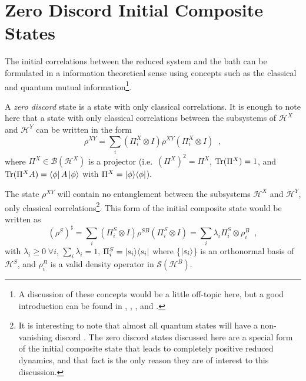 \section{Zero Discord Initial Composite States}
The initial correlations between the reduced system and the bath can be formulated in a information theoretical sense using concepts such as the classical and quantum mutual information\footnote{A discussion of these concepts would be a little off-topic here, but a good introduction can be found in \cite{Zurek2003}, \cite{Zurek2002}, \cite{Ollivier2001}, \cite{Rodriguez2010} and \cite{Rodriguez2008A}.}.  
\begin{definition}
A {\em zero discord} state is a state with only classical correlations.  It is enough to note here that a state with only classical correlations between the subsystems of $\mathcal{H}^X$ and $\mathcal{H}^Y$ can be written in the form \cite{Rodriguez2008}
\begin{equation*}
\rho^{XY} = \sum_i \left(\Pi^X_i\otimes I\right) \rho^{XY} \left(\Pi^X_i\otimes I\right)\;\;,
\end{equation*}
where $\Pi^X\in\mathcal{B}(\mathcal{H}^X)$ is a projector (i.e.\ $\left(\Pi^X\right)^2 = \Pi^X$, $\operatorname{Tr}(\Pi^X) = 1$, and $\operatorname{Tr}(\Pi^X A) = \left\langle\phi\right|A\left|\phi\right\rangle$ with $\Pi^X=|\phi\rangle\langle\phi|$).  
\end{definition}
The state $\rho^{XY}$ will contain no entanglement between the subsystems $\mathcal{H}^X$ and $\mathcal{H}^Y$, only classical correlations\footnote{It is interesting to note that almost all quantum states will have a non-vanishing discord \cite{Ferraro2010}.  The zero discord states discussed here are a special form of the initial composite state that leads to completely positive reduced dynamics, and that fact is the only reason they are of interest to this discussion.}.  This form of the initial composite state would be written as \cite{Rodriguez2008}
\begin{equation*}
\left(\rho^{S}\right)^\sharp = \sum_i \left( \Pi^S_i \otimes I\right) \rho^{SB} \left(\Pi^S_i \otimes I \right) = \sum_i \lambda_i \Pi^S_i \otimes \rho^B_i\;\;,
\end{equation*}
with $\lambda_i\ge 0\;\forall i$, $\sum_i \lambda_i = 1$, $\Pi^S_i=|s_i\rangle\langle s_i|$ where \{$\left|s_i\right\rangle$\} is an orthonormal basis of $\mathcal{H}^S$, and $\rho^B_i$ is a valid density operator in $\mathcal{S}(\mathcal{H}^B)$.

